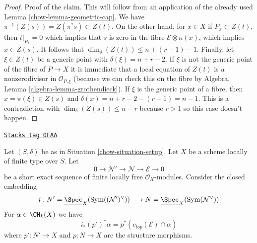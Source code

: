 \begin{proof}
\medskip\noindent
Proof of the claim. This will follow from an application of
the already used Lemma \ref{chow-lemma-geometric-cap}.
We have $\pi^{-1}(Z(s)) = Z(\pi^*s) \subset Z(t)$.
On the other hand, for $x \in X$ if $P_x \subset Z(t)$, then
$t|_{P_x} = 0$ which implies that $s$ is zero in the fibre
$\mathcal{E} \otimes \kappa(x)$, which implies $x \in Z(s)$.
It follows that $\dim_\delta(Z(t)) \leq n + (r - 1) - 1$.
Finally, let $\xi \in Z(t)$ be a generic point with
$\delta(\xi) = n + r - 2$. If $\xi$ is not the generic point
of the fibre of $P \to X$ it is immediate that
a local equation of $Z(t)$ is a nonzerodivisor in $\mathcal{O}_{P, \xi}$
(because we can check this on the fibre by
Algebra, Lemma \ref{algebra-lemma-grothendieck}).
If $\xi$ is the generic point of a fibre, then $x = \pi(\xi) \in Z(s)$
and $\delta(x) = n + r - 2 - (r - 1) = n - 1$. This is a contradiction
with $\dim_\delta(Z(s)) \leq n - r$ because $r > 1$
so this case doesn't happen.
\end{proof}

\begin{lemma}
\label{chow-lemma-easy-virtual-class}
\href{https://stacks.math.columbia.edu/tag/0FAA}{\texttt{Stacks tag 0FAA}}

Let $(S, \delta)$ be as in Situation \ref{chow-situation-setup}. Let $X$
be a scheme locally of finite type over $S$. Let
$$
0 \to \mathcal{N}' \to \mathcal{N} \to \mathcal{E} \to 0
$$
be a short exact sequence of finite locally free $\mathcal{O}_X$-modules.
Consider the closed embedding
$$
i :
N' = \underline{\Spec}_X(\text{Sym}((\mathcal{N}')^\vee))
\longrightarrow
N = \underline{\Spec}_X(\text{Sym}(\mathcal{N}^\vee))
$$
For $\alpha \in \CH_k(X)$ we have
$$
i_*(p')^*\alpha = p^*(c_{top}(\mathcal{E}) \cap \alpha)
$$
where $p' : N' \to X$ and $p : N \to X$ are the structure morphisms.
\end{lemma}

